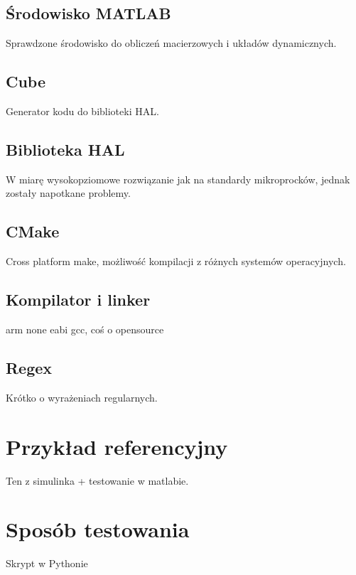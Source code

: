\subsection{Środowisko MATLAB} \label{sec:matlab}
Sprawdzone środowisko do obliczeń macierzowych i układów dynamicznych.

\subsection{Cube} \label{sec:cube}
Generator kodu do biblioteki HAL.

\subsection{Biblioteka HAL} \label{sec:hal}
W miarę wysokopziomowe rozwiązanie jak na standardy mikroprocków, jednak zostały napotkane problemy.

\subsection{CMake} \label{sec:cmake}
Cross platform make, możliwość kompilacji z różnych systemów operacyjnych.

\subsection{Kompilator i linker} \label{sec:gcc}
arm none eabi gcc, coś o opensource

\subsection{Regex} \label{sec:regex}
Krótko o wyrażeniach regularnych.

\section{Przykład referencyjny} \label{sec:ref}
Ten z simulinka + testowanie w matlabie.

\section{Sposób testowania} \label{sec:tests}
Skrypt w Pythonie
